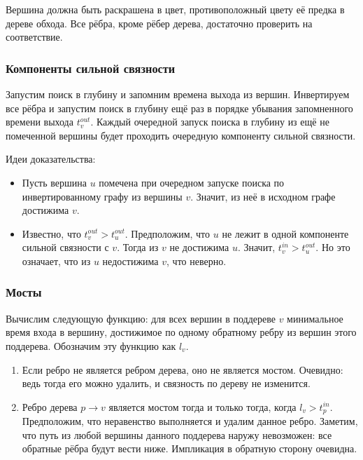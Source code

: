 \documentclass[a4paper,12pt]{article}
\begin{document}
      Вершина должна быть раскрашена в цвет, противоположный цвету
      её предка в дереве обхода. Все рёбра, кроме рёбер дерева,
      достаточно проверить на соответствие.

      \subsubsection{Компоненты сильной связности}

      Запустим поиск в глубину и запомним времена выхода из вершин.
      Инвертируем все рёбра и запустим поиск в глубину ещё раз
      в порядке убывания запомненного времени выхода $t^{out}_v$.
      Каждый очередной запуск поиска в глубину из ещё не помеченной
      вершины будет проходить очередную компоненту сильной связности.

      Идеи доказательства:
      \begin{itemize}
        \item Пусть вершина $u$ помечена при очередном запуске поиска
          по инвертированному графу из вершины $v$.
          Значит, из неё в исходном графе достижима $v$.
        \item Известно, что $t^{out}_v > t^{out}_u$.
          Предположим, что $u$ не лежит в одной компоненте сильной
          связности с $v$. Тогда из $v$ не достижима $u$. Значит,
          $t^{in}_v > t^{out}_u$. Но это означает, что из $u$
          недостижима $v$, что неверно.
      \end{itemize}

      \subsubsection{Мосты}

      Вычислим следующую функцию: для всех вершин в поддереве $v$
      минимальное время входа в вершину, достижимое по одному
      обратному ребру из вершин этого поддерева. Обозначим эту
      функцию как $l_v$.

      \begin{enumerate}
        \item Если ребро не является ребром дерева, оно не является
          мостом. Очевидно: ведь тогда его можно удалить, и связность
          по дереву не изменится.
        \item Ребро дерева $p \to v$ является мостом тогда и только
          тогда, когда $l_v > t^{in}_p$. Предположим, что неравенство
          выполняется и удалим данное ребро. Заметим, что путь из
          любой вершины данного поддерева наружу невозможен: все
          обратные рёбра будут вести ниже. Импликация в обратную
          сторону очевидна.
      \end{enumerate}
\end{document}
